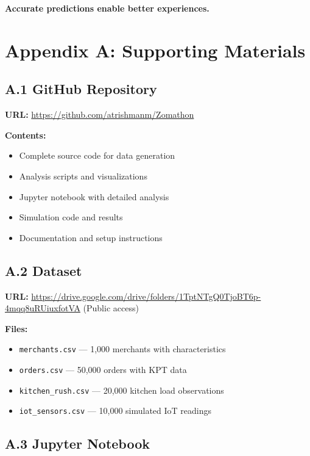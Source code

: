 \documentclass[11pt,a4paper]{article}
\begin{document}
\vspace{1cm}

\begin{center}
\textbf{\Large Accurate predictions enable better experiences.}
\end{center}

\newpage

\section*{Appendix A: Supporting Materials}

\subsection*{A.1 GitHub Repository}

\textbf{URL:} \url{https://github.com/atrishmanm/Zomathon}

\textbf{Contents:}
\begin{itemize}
    \item Complete source code for data generation
    \item Analysis scripts and visualizations
    \item Jupyter notebook with detailed analysis
    \item Simulation code and results
    \item Documentation and setup instructions
\end{itemize}

\subsection*{A.2 Dataset}

\textbf{URL:} \url{https://drive.google.com/drive/folders/1TptNTgQ0TjoBT6p-4mqq8uRUiuxfotVA} (Public access)

\textbf{Files:}
\begin{itemize}
    \item \texttt{merchants.csv} — 1,000 merchants with characteristics
    \item \texttt{orders.csv} — 50,000 orders with KPT data
    \item \texttt{kitchen\_rush.csv} — 20,000 kitchen load observations
    \item \texttt{iot\_sensors.csv} — 10,000 simulated IoT readings
\end{itemize}

\subsection*{A.3 Jupyter Notebook}
\end{document}
